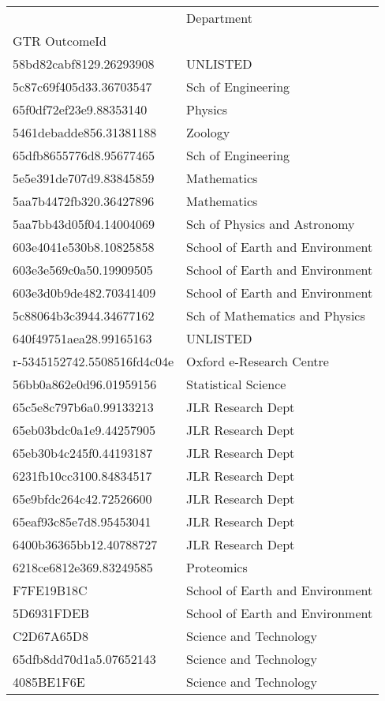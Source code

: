 \begin{tabular}{ll}
\toprule
 & Department \\
GTR OutcomeId &  \\
\midrule
58bd82cabf8129.26293908 & UNLISTED \\
5c87c69f405d33.36703547 & Sch of Engineering \\
65f0df72ef23e9.88353140 & Physics \\
5461debadde856.31381188 & Zoology \\
65dfb8655776d8.95677465 & Sch of Engineering \\
5e5e391de707d9.83845859 & Mathematics \\
5aa7b4472fb320.36427896 & Mathematics \\
5aa7bb43d05f04.14004069 & Sch of Physics and Astronomy \\
603e4041e530b8.10825858 & School of Earth and Environment \\
603e3e569c0a50.19909505 & School of Earth and Environment \\
603e3d0b9de482.70341409 & School of Earth and Environment \\
5c88064b3c3944.34677162 & Sch of Mathematics and Physics \\
640f49751aea28.99165163 & UNLISTED \\
r-5345152742.5508516fd4c04e & Oxford e-Research Centre \\
56bb0a862e0d96.01959156 & Statistical Science \\
65c5e8c797b6a0.99133213 & JLR Research Dept \\
65eb03bdc0a1e9.44257905 & JLR Research Dept \\
65eb30b4c245f0.44193187 & JLR Research Dept \\
6231fb10cc3100.84834517 & JLR Research Dept \\
65e9bfdc264c42.72526600 & JLR Research Dept \\
65eaf93c85e7d8.95453041 & JLR Research Dept \\
6400b36365bb12.40788727 & JLR Research Dept \\
6218ce6812e369.83249585 & Proteomics \\
F7FE19B18C & School of Earth and Environment \\
5D6931FDEB & School of Earth and Environment \\
C2D67A65D8 & Science and Technology \\
65dfb8dd70d1a5.07652143 & Science and Technology \\
4085BE1F6E & Science and Technology \\

\end{tabular}

